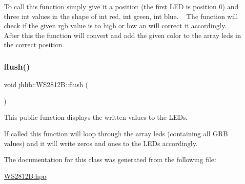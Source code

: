 To call this function simply give it a position (the first L\+ED is position 0) and three int values in the shape of int red, int green, int blue. ~\newline
 The function will check if the given rgb value is to high or low an will correct it accordingly. ~\newline
 After this the function will convert and add the given color to the array leds in the correct position. \mbox{\label{classjhlib_1_1WS2812B_ac7a20c6eadaafa1449bada58669bc7c6}} 
\subsubsection{\texorpdfstring{flush()}{flush()}}
{\footnotesize\ttfamily void jhlib\+::\+W\+S2812\+B\+::flush (\begin{DoxyParamCaption}{ }\end{DoxyParamCaption})\hspace{0.3cm}{\ttfamily [inline]}}



This public function displays the written values to the L\+E\+Ds. 

If called this function will loop through the array leds (containing all G\+RB values) and it will write zeros and ones to the L\+E\+Ds accordingly. 

The documentation for this class was generated from the following file\+:\begin{DoxyCompactItemize}
\item 
\hyperlink{WS2812B_8hpp}{W\+S2812\+B.\+hpp}\end{DoxyCompactItemize}
